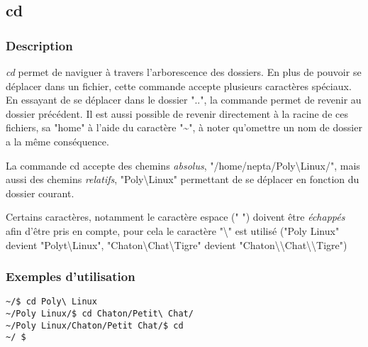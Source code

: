 \subsection*{cd}
\subsubsection*{Description}
\emph{cd} permet de naviguer à travers l'arborescence des dossiers.
En plus de pouvoir se déplacer dans un fichier, cette commande accepte plusieurs caractères spéciaux.
En essayant de se déplacer dans le dossier "..", la commande permet de revenir au dossier précédent.
Il est aussi possible de revenir directement à la racine de ces fichiers, sa "home" à l'aide du caractère "\~{}", à noter qu'omettre un nom de dossier a la même conséquence.

La commande cd accepte des chemins \emph{absolus}, "/home/nepta/Poly\textbackslash Linux/", mais aussi des chemins \emph{relatifs}, "Poly\textbackslash \textvisiblespace Linux" permettant de se déplacer en fonction du dossier courant.

Certains caractères, notamment le caractère espace (" ") doivent être \emph{échappés} afin d'être pris en compte, pour cela le caractère "\textbackslash" est utilisé ("Poly Linux" devient "Polyt\textbackslash Linux",
"Chaton\textbackslash Chat\textbackslash Tigre" devient "Chaton\textbackslash \textbackslash Chat\textbackslash \textbackslash Tigre")

\subsubsection*{Exemples d'utilisation}

\begin{lstlisting}
~/$ cd Poly\ Linux
~/Poly Linux/$ cd Chaton/Petit\ Chat/
~/Poly Linux/Chaton/Petit Chat/$ cd
~/ $ 
\end{lstlisting}
